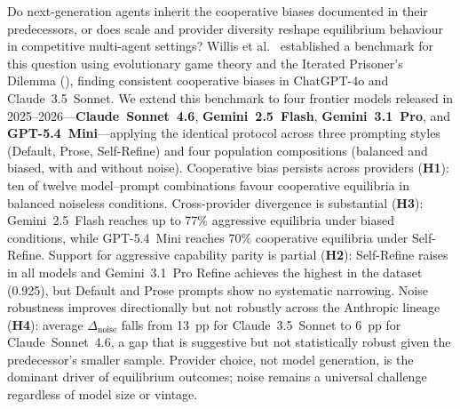 Do next-generation \LLM agents inherit the cooperative biases documented in
their predecessors, or does scale and provider diversity reshape equilibrium
behaviour in competitive multi-agent settings? Willis et al.\ \cite{Willis2025_llm_ipd}
established a benchmark for this question using evolutionary game theory and
the Iterated Prisoner's Dilemma (\IPD), finding consistent cooperative biases
in ChatGPT-4o and Claude~3.5~Sonnet. We extend this benchmark to four frontier
models released in 2025--2026---\textbf{Claude~Sonnet~4.6}, \textbf{Gemini~2.5~Flash},
\textbf{Gemini~3.1~Pro}, and \textbf{GPT-5.4~Mini}---applying the identical
protocol across three prompting styles (Default, Prose, Self-Refine) and four
population compositions (balanced and biased, with and without noise).
Cooperative bias persists across providers (\textbf{H1}): ten of twelve
model--prompt combinations favour cooperative equilibria in balanced noiseless
conditions. Cross-provider divergence is substantial (\textbf{H3}): Gemini~2.5~Flash
reaches up to 77\% aggressive equilibria under biased conditions, while GPT-5.4~Mini
reaches 70\% cooperative equilibria under Self-Refine. Support for aggressive
capability parity is partial (\textbf{H2}): Self-Refine raises \ICD in all
models and Gemini~3.1~Pro Refine achieves the highest \ICD in the dataset
(0.925), but Default and Prose prompts show no systematic narrowing. Noise
robustness improves directionally but not robustly across the Anthropic lineage
(\textbf{H4}): average $\Delta_{\text{noise}}$ falls from 13~pp for
Claude~3.5~Sonnet to 6~pp for Claude~Sonnet~4.6, a gap that is suggestive but
not statistically robust given the predecessor's smaller sample. Provider choice,
not model generation, is the dominant driver of equilibrium outcomes; noise
remains a universal challenge regardless of model size or vintage.
